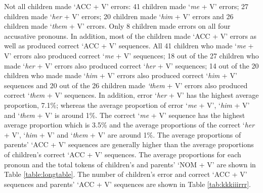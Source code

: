 Not all children made `ACC + V' errors: 41 children made `\textit{me} + V' errors; 27 children made `\textit{her} + V' errors; 20 children made `\textit{him} + V' errors and 26 children made `\textit{them} + V' errors. Only 8 children made errors on all four accusative pronouns. In addition, most of the children made `ACC + V' errors as well as produced correct `ACC + V' sequences. All 41 children who made `\textit{me} + V' errors also produced correct `\textit{me} + V' sequences; 18 out of the 27 children who made `\textit{her} + V' errors also produced correct `\textit{her} + V' sequences; 14 out of the 20 children who made made `\textit{him} + V' errors also produced correct `\textit{him} + V' sequences and 20 out of the 26 children made \textit{`them} + V' errors also produced correct `\textit{them} + V' sequences. In addition, error `\textit{her} + V' has the highest average proportion, 7.1\%; whereas the average proportion of error `\textit{me} + V', `\textit{him} + V' and `\textit{them} + V' is around 1\%. The correct `\textit{me} + V' sequence has the highest average proportion which is 3.5\% and the average proportions of the correct `\textit{her} + V', `\textit{him} + V' and  `\textit{them} + V' are around 1\%. The average proportions of parents' `ACC + V' sequences are generally higher than the average proportions of children's correct `ACC + V' sequences. The average proportions for each pronoun and the total tokens of children's and parents' `NOM + V' are shown in Table \ref{table:longtable}. The number of children's error and correct `ACC + V' sequences and parents' `ACC + V' sequences are shown in Table \ref{tab:kkkiiirrr}. 

